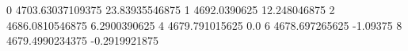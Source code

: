 0 4703.63037109375 23.83935546875
1 4692.0390625 12.248046875
2 4686.0810546875 6.2900390625
4 4679.791015625 0.0
6 4678.697265625 -1.09375
8 4679.4990234375 -0.2919921875
